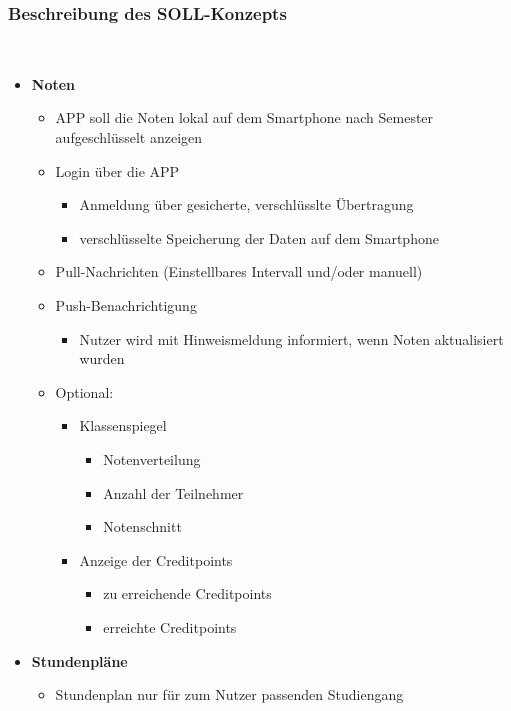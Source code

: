\subsubsection{\textbf{Beschreibung des SOLL-Konzepts}}\
\\
\begin{itemize}
		\item \textbf{Noten}
			\begin{itemize}
				\item APP soll die Noten lokal auf dem Smartphone nach Semester aufgeschlüsselt anzeigen
				\item Login über die APP
					\begin{itemize}
						\item Anmeldung über gesicherte, verschlüsslte Übertragung
						\item verschlüsselte Speicherung der Daten auf dem Smartphone
					\end{itemize}
				\item Pull-Nachrichten (Einstellbares Intervall und/oder manuell)
				\item Push-Benachrichtigung
					\begin{itemize}
						\item Nutzer wird mit Hinweismeldung informiert, wenn Noten aktualisiert wurden					
					\end{itemize}
				\item Optional:
					\begin{itemize}
						\item Klassenspiegel
							\begin{itemize}
								\item Notenverteilung
								\item Anzahl der Teilnehmer
								\item Notenschnitt
							\end{itemize}
						\item Anzeige der Creditpoints
							\begin{itemize}
								\item zu erreichende Creditpoints
								\item erreichte Creditpoints
							\end{itemize}
					\end{itemize}
			\end{itemize}
		\item \textbf{Stundenpläne}
			\begin{itemize}
				\item Stundenplan nur für zum Nutzer passenden Studiengang

\end{itemize}
\end{itemize}
